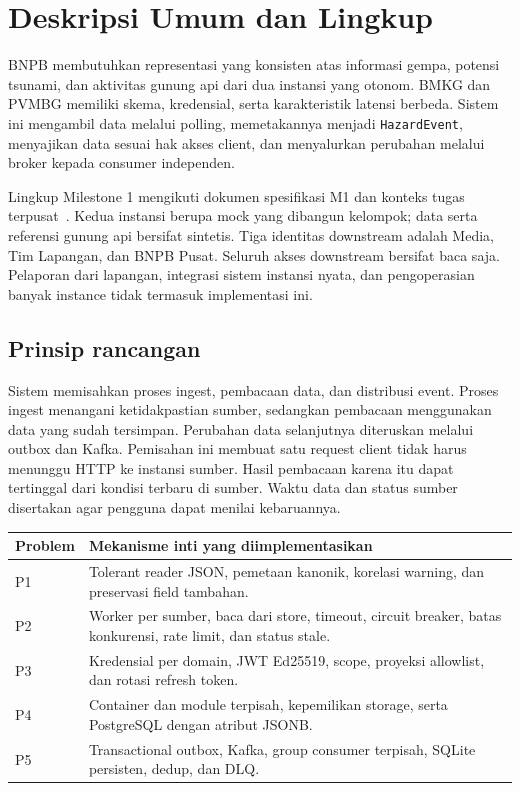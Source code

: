 \section{Deskripsi Umum dan Lingkup}
BNPB membutuhkan representasi yang konsisten atas informasi gempa, potensi tsunami, dan aktivitas gunung api dari dua instansi yang otonom. BMKG dan PVMBG memiliki skema, kredensial, serta karakteristik latensi berbeda. Sistem ini mengambil data melalui polling, memetakannya menjadi \texttt{HazardEvent}, menyajikan data sesuai hak akses client, dan menyalurkan perubahan melalui broker kepada consumer independen.

Lingkup Milestone 1 mengikuti dokumen spesifikasi M1 dan konteks tugas terpusat~\cite{spec-m1,spec-central}. Kedua instansi berupa mock yang dibangun kelompok; data serta referensi gunung api bersifat sintetis. Tiga identitas downstream adalah Media, Tim Lapangan, dan BNPB Pusat. Seluruh akses downstream bersifat baca saja. Pelaporan dari lapangan, integrasi sistem instansi nyata, dan pengoperasian banyak instance tidak termasuk implementasi ini.

\subsection{Prinsip rancangan}
Sistem memisahkan proses ingest, pembacaan data, dan distribusi event. Proses ingest menangani ketidakpastian sumber, sedangkan pembacaan menggunakan data yang sudah tersimpan. Perubahan data selanjutnya diteruskan melalui outbox dan Kafka. Pemisahan ini membuat satu request client tidak harus menunggu HTTP ke instansi sumber. Hasil pembacaan karena itu dapat tertinggal dari kondisi terbaru di sumber. Waktu data dan status sumber disertakan agar pengguna dapat menilai kebaruannya.

\begin{tabularx}{\linewidth}{lY}
\toprule Problem & Mekanisme inti yang diimplementasikan\\\midrule
P1 & Tolerant reader JSON, pemetaan kanonik, korelasi warning, dan preservasi field tambahan.\\
P2 & Worker per sumber, baca dari store, timeout, circuit breaker, batas konkurensi, rate limit, dan status stale.\\
P3 & Kredensial per domain, JWT Ed25519, scope, proyeksi allowlist, dan rotasi refresh token.\\
P4 & Container dan module terpisah, kepemilikan storage, serta PostgreSQL dengan atribut JSONB.\\
P5 & Transactional outbox, Kafka, group consumer terpisah, SQLite persisten, dedup, dan DLQ.\\
\bottomrule
\end{tabularx}


